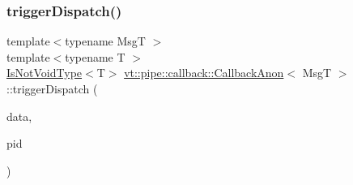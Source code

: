 \mbox{\label{structvt_1_1pipe_1_1callback_1_1_callback_anon_a394463dec0c5e2dd0a96f7f8b6d6cfae}} 
\subsubsection{\texorpdfstring{trigger\+Dispatch()}{triggerDispatch()}\hspace{0.1cm}{\footnotesize\ttfamily [3/4]}}
{\footnotesize\ttfamily template$<$typename MsgT $>$ \\
template$<$typename T $>$ \\
\hyperlink{structvt_1_1pipe_1_1callback_1_1_callback_anon_a91e58fe2f8165c826cecedde7e4535cf}{Is\+Not\+Void\+Type}$<$T$>$ \hyperlink{structvt_1_1pipe_1_1callback_1_1_callback_anon}{vt\+::pipe\+::callback\+::\+Callback\+Anon}$<$ MsgT $>$\+::trigger\+Dispatch (\begin{DoxyParamCaption}\item[{\hyperlink{structvt_1_1pipe_1_1callback_1_1_callback_anon_ac503b95feb44bb0b60c1d69e1ed29074}{Signal\+Data\+Type} $\ast$}]{data,  }\item[{\hyperlink{namespacevt_ac9852acda74d1896f48f406cd72c7bd3}{Pipe\+Type} const \&}]{pid }\end{DoxyParamCaption})\hspace{0.3cm}{\ttfamily [private]}}

\mbox{\label{structvt_1_1pipe_1_1callback_1_1_callback_anon_a2d66de99b38b4c89f880c408346247de}} 
